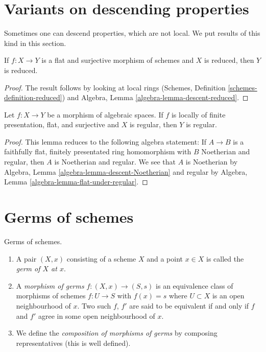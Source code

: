 \section{Variants on descending properties}
\label{section-variants}

\noindent
Sometimes one can descend properties, which are not local.
We put results of this kind in this section.

\begin{lemma}
\label{lemma-descend-reduced}
If $f : X \to Y$ is a flat and surjective morphism of schemes
and $X$ is reduced, then $Y$ is reduced.
\end{lemma}

\begin{proof}
The result follows by looking at local rings
(Schemes, Definition \ref{schemes-definition-reduced})
and
Algebra, Lemma \ref{algebra-lemma-descent-reduced}.
\end{proof}

\begin{lemma}
\label{lemma-descend-regular}
Let $f : X \to Y$ be a morphism of algebraic spaces.
If $f$ is locally of finite presentation, flat, and surjective and
$X$ is regular, then $Y$ is regular.
\end{lemma}

\begin{proof}
This lemma reduces to the following algebra statement: If $A \to B$ is
a faithfully flat, finitely presentated ring homomorphism with $B$ Noetherian
and regular, then $A$ is Noetherian and regular. We see that
$A$ is Noetherian by
Algebra, Lemma \ref{algebra-lemma-descent-Noetherian}
and regular by
Algebra, Lemma \ref{algebra-lemma-flat-under-regular}.
\end{proof}









\section{Germs of schemes}
\label{section-germs}

\begin{definition}
\label{definition-germs}
Germs of schemes.
\begin{enumerate}
\item A pair $(X, x)$ consisting of a scheme $X$ and a point $x \in X$ is
called the {\it germ of $X$ at $x$}.
\item A {\it morphism of germs} $f : (X, x) \to (S, s)$
is an equivalence class of morphisms of schemes $f : U \to S$ with $f(x) = s$
where $U \subset X$ is an open neighbourhood of $x$. Two such
$f$, $f'$ are said to be equivalent if and only if $f$ and $f'$
agree in some open neighbourhood of $x$.
\item We define the {\it composition of morphisms of germs}
by composing representatives (this is well defined).
\end{enumerate}
\end{definition}

